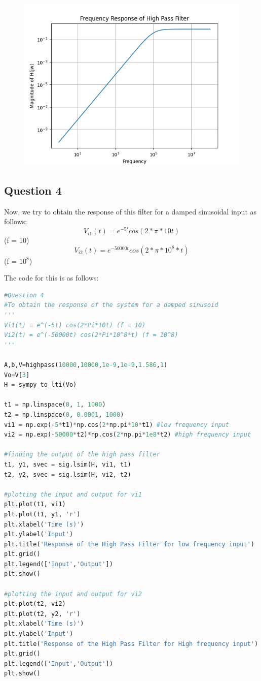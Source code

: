 \documentclass[11pt, a4paper]{article}
\begin{document}
\begin{figure}[H]
     \centering
     \includegraphics[scale=0.8]{Figure_3.png}
\end{figure}

\subsection{Question 4}
Now, we try to obtain the response of this filter for a damped sinusoidal input as follows:
\[V_{i1}(t) = e^{-5t} cos(2*\pi*10t)\] (f = 10)
\[V_{i2}(t) = e^{-50000t} cos(2*\pi*10^8*t) \] (f = $10^8$)

The code for this is as follows:\\
\begin{lstlisting}[language = Python]
#Question 4
#To obtain the response of the system for a damped sinusoid
'''
Vi1(t) = e^(-5t) cos(2*Pi*10t) (f = 10)
Vi2(t) = e^(-50000t) cos(2*Pi*10^8*t) (f = 10^8)
'''

A,b,V=highpass(10000,10000,1e-9,1e-9,1.586,1) 
Vo=V[3]
H = sympy_to_lti(Vo)

t1 = np.linspace(0, 1, 1000)
t2 = np.linspace(0, 0.0001, 1000)
vi1 = np.exp(-5*t1)*np.cos(2*np.pi*10*t1) #low frequency input
vi2 = np.exp(-50000*t2)*np.cos(2*np.pi*1e8*t2) #high frequency input

#finding the output of the high pass filter
t1, y1, svec = sig.lsim(H, vi1, t1)
t2, y2, svec = sig.lsim(H, vi2, t2)

#plotting the input and output for vi1
plt.plot(t1, vi1)
plt.plot(t1, y1, 'r')
plt.xlabel('Time (s)')
plt.ylabel('Input')
plt.title('Response of the High Pass Filter for low frequency input')
plt.grid()
plt.legend(['Input','Output'])
plt.show()

#plotting the input and output for vi2
plt.plot(t2, vi2)
plt.plot(t2, y2, 'r')
plt.xlabel('Time (s)')
plt.ylabel('Input')
plt.title('Response of the High Pass Filter for High frequency input')
plt.grid()
plt.legend(['Input','Output'])
plt.show()

\end{lstlisting}
\end{document}
